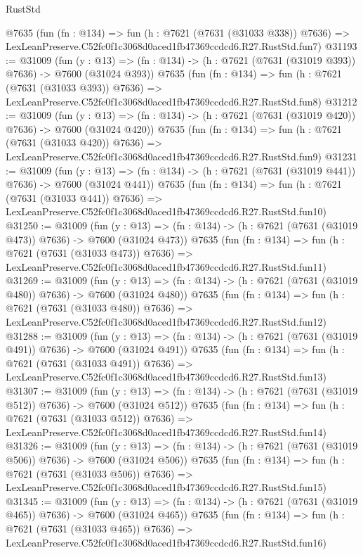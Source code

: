 \begin{lexlean}{RustStd}
\begin{coremodule}
    @7635
    (fun (fn : @134) =>
    fun (h : @7621 (@7631 (@31033 @338)) @7636) =>
    LexLeanPreserve.C52fc0f1c3068d0aced1fb47369ccdcd6.R27.RustStd.fun7)
@31193 := @31009
    (fun (y : @13) => (fn : @134) -> (h : @7621 (@7631 (@31019 @393)) @7636) -> @7600 (@31024 @393))
    @7635
    (fun (fn : @134) =>
    fun (h : @7621 (@7631 (@31033 @393)) @7636) =>
    LexLeanPreserve.C52fc0f1c3068d0aced1fb47369ccdcd6.R27.RustStd.fun8)
@31212 := @31009
    (fun (y : @13) => (fn : @134) -> (h : @7621 (@7631 (@31019 @420)) @7636) -> @7600 (@31024 @420))
    @7635
    (fun (fn : @134) =>
    fun (h : @7621 (@7631 (@31033 @420)) @7636) =>
    LexLeanPreserve.C52fc0f1c3068d0aced1fb47369ccdcd6.R27.RustStd.fun9)
@31231 := @31009
    (fun (y : @13) => (fn : @134) -> (h : @7621 (@7631 (@31019 @441)) @7636) -> @7600 (@31024 @441))
    @7635
    (fun (fn : @134) =>
    fun (h : @7621 (@7631 (@31033 @441)) @7636) =>
    LexLeanPreserve.C52fc0f1c3068d0aced1fb47369ccdcd6.R27.RustStd.fun10)
@31250 := @31009
    (fun (y : @13) => (fn : @134) -> (h : @7621 (@7631 (@31019 @473)) @7636) -> @7600 (@31024 @473))
    @7635
    (fun (fn : @134) =>
    fun (h : @7621 (@7631 (@31033 @473)) @7636) =>
    LexLeanPreserve.C52fc0f1c3068d0aced1fb47369ccdcd6.R27.RustStd.fun11)
@31269 := @31009
    (fun (y : @13) => (fn : @134) -> (h : @7621 (@7631 (@31019 @480)) @7636) -> @7600 (@31024 @480))
    @7635
    (fun (fn : @134) =>
    fun (h : @7621 (@7631 (@31033 @480)) @7636) =>
    LexLeanPreserve.C52fc0f1c3068d0aced1fb47369ccdcd6.R27.RustStd.fun12)
@31288 := @31009
    (fun (y : @13) => (fn : @134) -> (h : @7621 (@7631 (@31019 @491)) @7636) -> @7600 (@31024 @491))
    @7635
    (fun (fn : @134) =>
    fun (h : @7621 (@7631 (@31033 @491)) @7636) =>
    LexLeanPreserve.C52fc0f1c3068d0aced1fb47369ccdcd6.R27.RustStd.fun13)
@31307 := @31009
    (fun (y : @13) => (fn : @134) -> (h : @7621 (@7631 (@31019 @512)) @7636) -> @7600 (@31024 @512))
    @7635
    (fun (fn : @134) =>
    fun (h : @7621 (@7631 (@31033 @512)) @7636) =>
    LexLeanPreserve.C52fc0f1c3068d0aced1fb47369ccdcd6.R27.RustStd.fun14)
@31326 := @31009
    (fun (y : @13) => (fn : @134) -> (h : @7621 (@7631 (@31019 @506)) @7636) -> @7600 (@31024 @506))
    @7635
    (fun (fn : @134) =>
    fun (h : @7621 (@7631 (@31033 @506)) @7636) =>
    LexLeanPreserve.C52fc0f1c3068d0aced1fb47369ccdcd6.R27.RustStd.fun15)
@31345 := @31009
    (fun (y : @13) => (fn : @134) -> (h : @7621 (@7631 (@31019 @465)) @7636) -> @7600 (@31024 @465))
    @7635
    (fun (fn : @134) =>
    fun (h : @7621 (@7631 (@31033 @465)) @7636) =>
    LexLeanPreserve.C52fc0f1c3068d0aced1fb47369ccdcd6.R27.RustStd.fun16)

\end{coremodule}
\end{lexlean}

